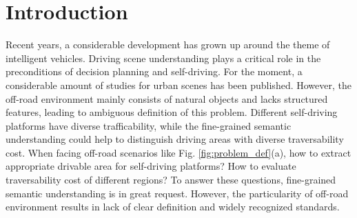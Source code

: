 \documentclass[letterpaper, 10 pt, conference]{ieeeconf}  %
\begin{document}
\section{Introduction}
Recent years, a considerable development has grown up around the theme of intelligent vehicles. Driving scene understanding plays a critical role in the preconditions of decision planning and self-driving. For the moment, a considerable amount of studies for urban scenes has been published. However, the off-road environment mainly consists of natural objects and lacks structured features, leading to ambiguous definition of this problem.
Different self-driving platforms have diverse trafficability, while the fine-grained semantic understanding could help to distinguish driving areas with diverse traversability cost. When facing off-road scenarios like Fig. \ref{fig:problem_def}(a), how to extract appropriate drivable area for self-driving platforms? How to evaluate traversability cost of different regions? To answer these questions, fine-grained semantic understanding is in great request. However, the particularity of off-road environment results in lack of clear definition and widely recognized standards.

\end{document}
